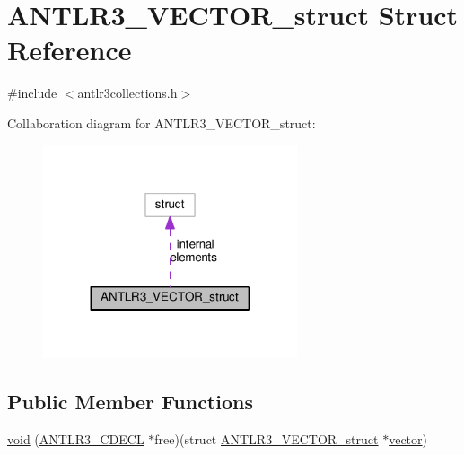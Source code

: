 \hypertarget{struct_a_n_t_l_r3___v_e_c_t_o_r__struct}{\section{A\-N\-T\-L\-R3\-\_\-\-V\-E\-C\-T\-O\-R\-\_\-struct Struct Reference}
\label{struct_a_n_t_l_r3___v_e_c_t_o_r__struct}
}


{\ttfamily \#include $<$antlr3collections.\-h$>$}



Collaboration diagram for A\-N\-T\-L\-R3\-\_\-\-V\-E\-C\-T\-O\-R\-\_\-struct\-:
\nopagebreak
\begin{figure}[H]
\begin{center}
\leavevmode
\includegraphics[width=212pt]{struct_a_n_t_l_r3___v_e_c_t_o_r__struct__coll__graph}
\end{center}
\end{figure}
\subsection*{Public Member Functions}
\begin{DoxyCompactItemize}
\item 
\hyperlink{struct_a_n_t_l_r3___v_e_c_t_o_r__struct_ad1bb7dd18a16a705bf899dee6e15131d}{void} (\hyperlink{antlr3defs_8h_a91c919dd260a95cc88a0cd9b5c0a11cc}{A\-N\-T\-L\-R3\-\_\-\-C\-D\-E\-C\-L} $\ast$free)(struct \hyperlink{struct_a_n_t_l_r3___v_e_c_t_o_r__struct}{A\-N\-T\-L\-R3\-\_\-\-V\-E\-C\-T\-O\-R\-\_\-struct} $\ast$\hyperlink{qmb_8m_af54b69a32590de218622e869b06b47b3}{vector})
\end{DoxyCompactItemize}
